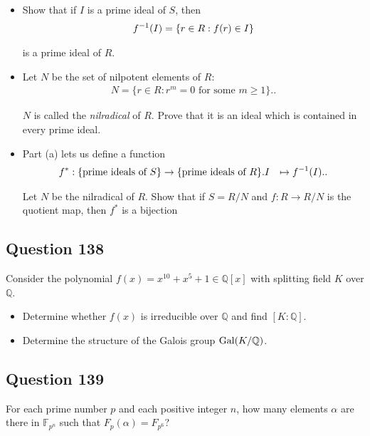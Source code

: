 \documentclass[12pt]{article}
\begin{document}
\begin{itemize}
\item
  Show that if \(I\) is a prime ideal of \(S\), then \begin{align*}
  f^{-1}(I)=\{r\in R:f(r)\in I\}
  \end{align*}

  is a prime ideal of \(R\).
\item
  Let \(N\) be the set of nilpotent elements of \(R\): \begin{align*}
  N=\{r\in R:r^m=0\text{ for some }m\geq 1\}.
  .\end{align*}

  \(N\) is called the \textit{nilradical} of \(R\). Prove that it is an
  ideal which is contained in every prime ideal.
\item
  Part (a) lets us define a function \begin{align*}
  f^*:\{\text{prime ideals of }S\} &\rightarrow
  \{\text{prime ideals of }R\}.
  I &\mapsto f^{-1}(I).
  .\end{align*}

  Let \(N\) be the nilradical of \(R\). Show that if \(S=R/N\) and
  \(f:R\rightarrow R/N\) is the quotient map, then \(f^*\) is a
  bijection
\end{itemize}

\hypertarget{question-138}{%
\subsection{Question 138}\label{question-138}}

Consider the polynomial \(f(x)=x^{10}+x^5+1\in\mathbb Q[x]\) with
splitting field \(K\) over \(\mathbb Q\).

\begin{itemize}
\item
  Determine whether \(f(x)\) is irreducible over \(\mathbb Q\) and find
  \([K:\mathbb Q]\).
\item
  Determine the structure of the Galois group \(\mathrm{Gal}(K/\mathbb Q)\).
\end{itemize}

\hypertarget{question-139}{%
\subsection{Question 139}\label{question-139}}

For each prime number \(p\) and each positive integer \(n\), how many
elements \(\alpha\) are there in \(\mathbb F_{p^n}\) such that
\(F_p(\alpha)=F_{p^6}\)?
\end{document}
